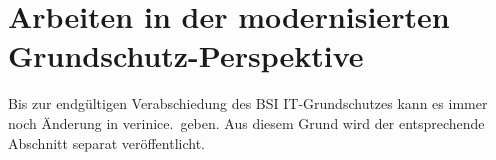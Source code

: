 \chapter{Arbeiten in der modernisierten Grundschutz-Perspektive}
\label{chap:baseline-protection}

Bis zur endgültigen Verabschiedung des BSI IT-Grundschutzes kann es immer noch
Änderung in verinice.\ geben. Aus diesem Grund wird der entsprechende Abschnitt
separat veröffentlicht.
